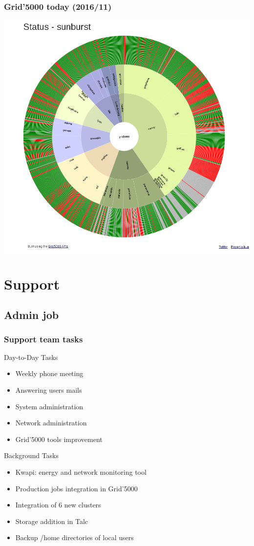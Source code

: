 \documentclass[11pt,compress]{beamer}
\begin{document}
\begin{frame}
\frametitle{Grid'5000 today (2016/11)}
\begin{center}
\includegraphics[scale=0.19]{figures/sunburst}
\end{center}
\end{frame}

\section{Support}
\subsection{Admin job}
\begin{frame}
\frametitle{Support team tasks}
Day-to-Day Tasks
\begin{itemize}
\item Weekly phone meeting
\item Answering users mails
\item System administration
\item Network administration
\item Grid'5000 tools improvement
\end{itemize}
Background Tasks
\begin{itemize}
\item Kwapi: energy and network monitoring tool
\item Production jobs integration in Grid'5000
\item Integration of 6 new clusters
\item Storage addition in Talc
\item Backup /home directories of local users
\end{itemize}
\end{frame}
\end{document}
